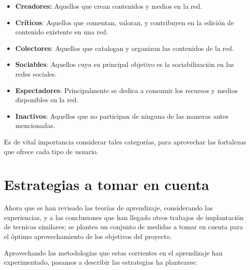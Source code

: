 \begin{itemize}
\item \textbf{Creadores:} Aquellos que crean contenidos y medios en la red.
\item \textbf{Críticos}: Aquellos que comentan, valoran, y contribuyen en la
      edición de contenido existente en una red.
\item \textbf{Colectores}: Aquellos que catalogan y organizan las contenidos de
      la red.
\item \textbf{Sociables}: Aquellos cuya su principal objetivo es la
      sociabilización en las redes sociales.
\item \textbf{Espectadores}: Principalmente se dedica a consumir los recursos y
      medios disponibles en la red.
\item \textbf{Inactivos}: Aquellos que no participan de ninguna de las maneras
      antes mencionadas.
\end{itemize}

Es de vital importancia considerar tales categorías, para aprovechar las
fortalezas que ofrece cada tipo de usuario.

\section{Estrategias a tomar en cuenta}

Ahora que se han revisado las teorías de aprendizaje, considerando las
experiencias, y a las conclusiones que han llegado otros trabajos de implantación
de tecnicas similares\cite{Ontalba}; se plantea un conjunto de medidas a tomar
en cuenta para el óptimo aprovechamiento de los objetivos del proyecto.

Aprovechando las metodologías que estas corrientes en el aprendizaje han
experimentado, pasamos a describir las estrategias ha plantearse:

